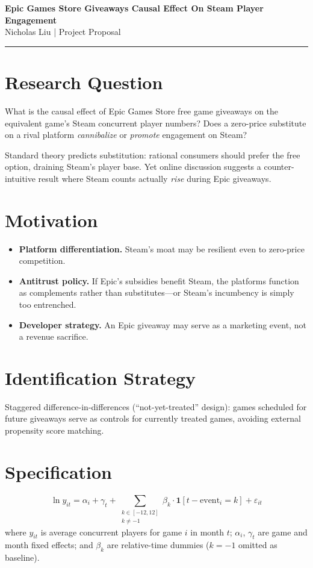 \documentclass[11pt]{article}
\begin{document}
\begin{center}
  {\large\bfseries Epic Games Store Giveaways Causal Effect On Steam Player Engagement}\\[0.4em]
  {\small Nicholas Liu \quad| Project Proposal}
\end{center}

\vspace{0.5em}
\hrule
\vspace{0.8em}

\section{Research Question}
What is the causal effect of Epic Games Store free game giveaways on the equivalent game's Steam concurrent player numbers? Does a zero-price substitute on a rival platform \textit{cannibalize} or \textit{promote} engagement on Steam?

Standard theory predicts substitution: rational consumers should prefer the free option, draining Steam's player base. Yet online discussion suggests a counter-intuitive result where Steam counts actually \textit{rise} during Epic giveaways.

\section{Motivation}
\begin{itemize}
  \item \textbf{Platform differentiation.} Steam's moat may be resilient even to zero-price competition.
  \item \textbf{Antitrust policy.} If Epic's subsidies benefit Steam, the platforms function as complements rather than substitutes---or Steam's incumbency is simply too entrenched.
  \item \textbf{Developer strategy.} An Epic giveaway may serve as a marketing event, not a revenue sacrifice.
\end{itemize}

\section{Identification Strategy}
Staggered difference-in-differences (``not-yet-treated'' design): games scheduled for future giveaways serve as controls for currently treated games, avoiding external propensity score matching.

\section{Specification}
\vspace{-0.3em}
\begin{equation}\label{eq:eventstudy}
\ln y_{it} = \alpha_i + \gamma_t + \sum_{\substack{k \in [-12,12] \\ k \neq -1}} \beta_k \cdot \mathbf{1}[t - \mathrm{event}_i = k] + \varepsilon_{it}
\end{equation}
\noindent where $y_{it}$ is average concurrent players for game $i$ in month $t$; $\alpha_i$, $\gamma_t$ are game and month fixed effects; and $\beta_k$ are relative-time dummies ($k=-1$ omitted as baseline).
\end{document}
